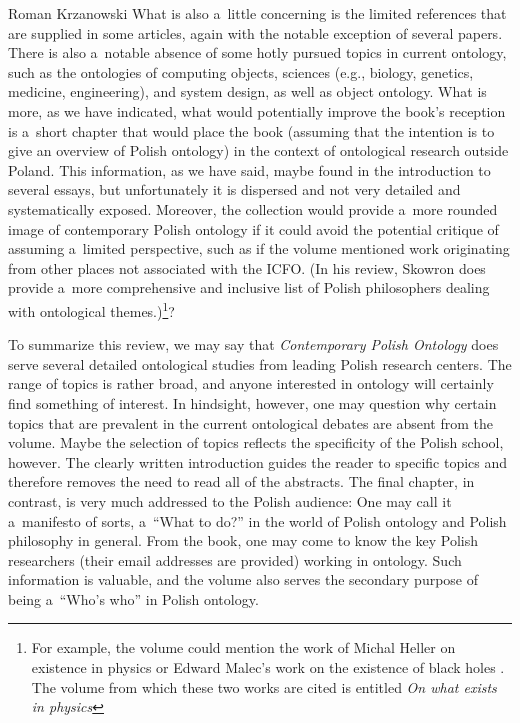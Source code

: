 \begin{recengenv}{Roman Krzanowski}
What is also a~little concerning is the limited references that are supplied in some articles, again with the notable exception of several papers. There is also a~notable absence of some hotly pursued topics in current ontology, such as the ontologies of computing objects, sciences (e.g., biology, genetics, medicine, engineering), and system design, as well as object ontology. What is more, as we have indicated, what would potentially improve the book's reception is a~short chapter that would place the book (assuming that the intention is to give an overview of Polish ontology) in the context of ontological research outside Poland. This information, as we have said, maybe found in the introduction to several essays, but unfortunately it is dispersed and not very detailed and systematically exposed. Moreover, the collection would provide a~more rounded image of %
contemporary Polish ontology if it could avoid the potential critique of assuming a~limited perspective, such as if the volume mentioned work originating from other places not associated with the ICFO. (In his review, Skowron does provide a~more comprehensive and inclusive list of Polish philosophers dealing with ontological themes.)\footnote{For example, the volume could mention the work of Michal Heller on existence in physics
\parencite[][]{heller_what_2018} %
 or Edward Malec's work on the existence of black holes 
\parencite[][]{malec_black_2018}. %
 The volume from which these two works are cited is entitled \textit{On what exists in physics}}?

\enlargethispage{-.5\baselineskip}
To summarize this review, we may say that \textit{Contemporary Polish Ontology} does serve several detailed ontological studies from leading Polish research centers. The range of topics is rather broad, and anyone interested in ontology will certainly find something of interest. In hindsight, however, one may question why certain topics that are prevalent in the current ontological debates are absent from the volume. Maybe the selection of topics reflects the specificity of the Polish school, however. The clearly written introduction guides the reader to specific topics and therefore removes the need to read all of the abstracts. The final chapter, in contrast, is very much addressed to the Polish audience: One may call it a~manifesto of sorts, a~“What to do?'' in the world of Polish ontology and Polish philosophy in general. From the book, one may come to know the key Polish researchers (their email addresses are provided) working in ontology. Such information is valuable, and the volume also serves the secondary purpose of being a~“Who's who'' in Polish ontology.



\end{recengenv}
